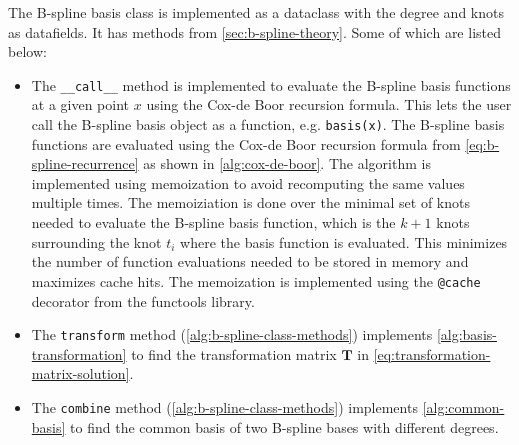 The B-spline basis class is implemented as a dataclass with the degree and knots as datafields. It has methods from \cref{sec:b-spline-theory}. Some of which are listed below:
\begin{itemize}
    \item 
    The \texttt{\_\_call\_\_} method is implemented to evaluate the B-spline basis functions at a given point $x$ using the Cox-de Boor recursion formula. This lets the user call the B-spline basis object as a function, e.g. \texttt{basis(x)}. The B-spline basis functions are evaluated using the Cox-de Boor recursion formula from \cref{eq:b-spline-recurrence} as shown in \cref{alg:cox-de-boor}. The algorithm is implemented using memoization to avoid recomputing the same values multiple times. The memoiziation is done over the minimal set of knots needed to evaluate the B-spline basis function, which is the $k+1$ knots surrounding the knot $t_i$ where the basis function is evaluated. This minimizes the number of function evaluations needed to be stored in memory and maximizes cache hits. The memoization is implemented using the \texttt{@cache} decorator from the functools library.
    \item
    The \texttt{transform} method (\cref{alg:b-spline-class-methods}) implements \cref{alg:basis-transformation} to find the transformation matrix $\mathbf T$ in \cref{eq:transformation-matrix-solution}.
    \item
    The \texttt{combine} method (\cref{alg:b-spline-class-methods}) implements \cref{alg:common-basis} to find the common basis of two B-spline bases with different degrees. 
\end{itemize}


